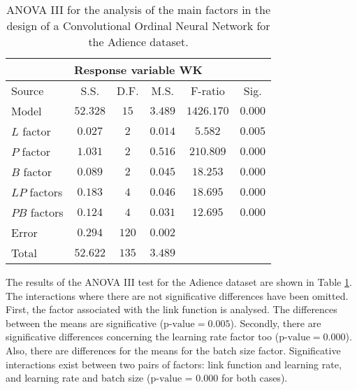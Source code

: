 \documentclass[journal]{IEEEtran}
\begin{document}
	\begin{table}[!t]
		\caption{ANOVA III for the analysis of the main factors in the design of a Convolutional Ordinal Neural Network for the Adience dataset.}
		\label{table:ANOVAAdience}
		\centering
		\small
		\begin{tabular}{l|ccccc}
			\multicolumn{6}{c}{Response variable WK}\\\hline
			Source & S.S. & D.F. & M.S. & F-ratio & Sig.\\\hline
			Model & $52.328$ & $15$ & $3.489$ & $1426.170$ & $0.000$\\
			$L$ factor & $0.027$ & $2$ & $0.014$ & $5.582$ & $0.005$\\
			$P$ factor & $1.031$ & $2$ & $0.516$ & $210.809$ & $0.000$\\
			$B$ factor & $0.089$ & $2$ & $0.045$ & $18.253$ & $0.000$\\
			$LP$ factors & $0.183$ & $4$ & $0.046$ & $18.695$ & $0.000$\\
			$PB$ factors & $0.124$ & $4$ & $0.031$ & $12.695$ & $0.000$\\
			Error & $0.294$ & $120$ & $0.002$ & & \\
			Total & $52.622$ & $135$ & $3.489$ & & 
		\end{tabular}
	\end{table}
	
	The results of the ANOVA III test for the Adience dataset are shown in Table \ref{table:ANOVAAdience}. The interactions where there are not significative differences have been omitted. First, the factor associated with the link function is analysed. The differences between the means are significative ($\text{p-value} = 0.005$). Secondly, there are significative differences concerning the learning rate factor too ($\text{p-value} = 0.000$). Also, there are differences for the means for the batch size factor. Significative interactions exist between two pairs of factors: link function and learning rate, and learning rate and batch size ($\text{p-value = 0.000}$ for both cases).
	
\end{document}
